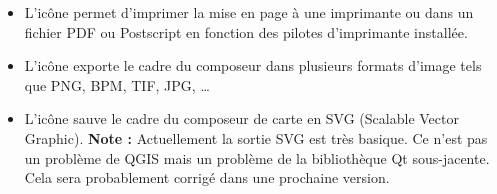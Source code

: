 \begin{itemize}
\item L'icône   permet d'imprimer la
mise en page à une imprimante ou dans un fichier PDF ou Postscript en fonction
des pilotes d'imprimante installée.
\item L'icône 
exporte le cadre du composeur dans plusieurs formats d'image tels que PNG, BPM,
TIF, JPG, \dots
\item L'icône  sauve le
cadre du composeur de carte en SVG (Scalable Vector Graphic). \textbf{Note :}
Actuellement la sortie SVG est très basique. Ce n'est pas un problème de QGIS
mais un problème de la bibliothèque Qt sous-jacente. Cela sera
probablement corrigé dans une prochaine version.
\end{itemize}
